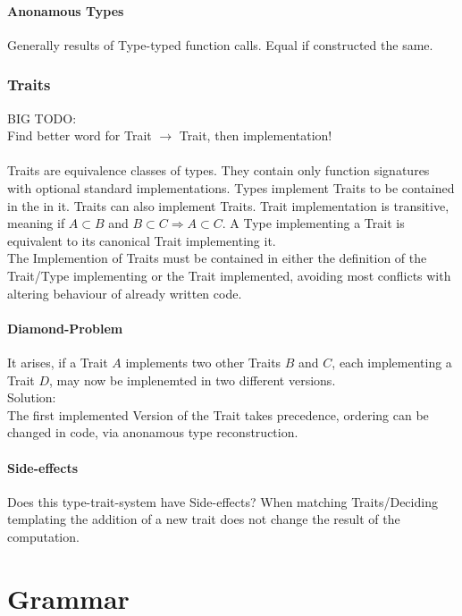 \documentclass{scrartcl}
\begin{document}
\subsection{Anonamous Types}
Generally results of Type-typed function calls. Equal if constructed the same.


\section{Traits}
BIG TODO:\\
Find better word for Trait $\rightarrow$ Trait, then implementation!\\
\\
Traits are equivalence classes of types. They contain only function signatures with optional standard implementations. Types implement Traits to be contained in the in it. Traits can also implement Traits. Trait implementation is transitive, meaning if $A \subset B$ and $B \subset C \Rightarrow A \subset C$. A Type implementing a Trait is equivalent to its canonical Trait implementing it.\\
The Implemention of Traits must be contained in either the definition of the Trait/Type implementing or the Trait implemented, avoiding most conflicts with altering behaviour of already written code.

\subsection{Diamond-Problem}
It arises, if a Trait $A$ implements two other Traits $B$ and $C$, each implementing a Trait $D$, may now be implenemted in two different versions.\\
Solution:\\
The first implemented Version of the Trait takes precedence, ordering can be changed in code, via anonamous type reconstruction.

\subsection{Side-effects}

Does this type-trait-system have Side-effects?
When matching Traits/Deciding templating the addition of a new trait does not change the result of the computation.



\part{Grammar}
\end{document}
